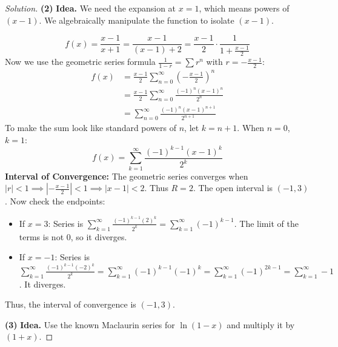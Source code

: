 \documentclass[11pt]{article}
\theoremstyle{definition}
\newenvironment{solution}{\begin{proof}[Solution]}{\end{proof}}
\begin{document}
\begin{solution}
\textbf{(2)} \textbf{Idea.} We need the expansion at $x=1$, which means powers of $(x-1)$. We algebraically manipulate the function to isolate $(x-1)$.

\[
f(x) = \frac{x-1}{x+1} = \frac{x-1}{(x-1) + 2} = \frac{x-1}{2} \cdot \frac{1}{1 + \frac{x-1}{2}}
\]
Now we use the geometric series formula $\frac{1}{1-r} = \sum r^n$ with $r = -\frac{x-1}{2}$:
\begin{align*}
f(x) &= \frac{x-1}{2} \sum_{n=0}^{\infty} \left( -\frac{x-1}{2} \right)^n \\
&= \frac{x-1}{2} \sum_{n=0}^{\infty} \frac{(-1)^n (x-1)^n}{2^n} \\
&= \sum_{n=0}^{\infty} \frac{(-1)^n (x-1)^{n+1}}{2^{n+1}}
\end{align*}
To make the sum look like standard powers of $n$, let $k = n+1$. When $n=0$, $k=1$:
\[
f(x) = \sum_{k=1}^{\infty} \frac{(-1)^{k-1} (x-1)^k}{2^k}
\]
\textbf{Interval of Convergence:}
The geometric series converges when $|r| < 1 \implies \left| -\frac{x-1}{2} \right| < 1 \implies |x-1| < 2$. Thus $R=2$. The open interval is $(-1, 3)$.
Now check the endpoints:
\begin{itemize}
    \item If $x=3$: Series is $\sum_{k=1}^{\infty} \frac{(-1)^{k-1} (2)^k}{2^k} = \sum_{k=1}^{\infty} (-1)^{k-1}$. The limit of the terms is not 0, so it diverges.
    \item If $x=-1$: Series is $\sum_{k=1}^{\infty} \frac{(-1)^{k-1} (-2)^k}{2^k} = \sum_{k=1}^{\infty} (-1)^{k-1} (-1)^k = \sum_{k=1}^{\infty} (-1)^{2k-1} = \sum_{k=1}^{\infty} -1$. It diverges.
\end{itemize}
Thus, the interval of convergence is $(-1, 3)$.

\textbf{(3)} \textbf{Idea.} Use the known Maclaurin series for $\ln(1-x)$ and multiply it by $(1+x)$.


\end{solution}
\end{document}
